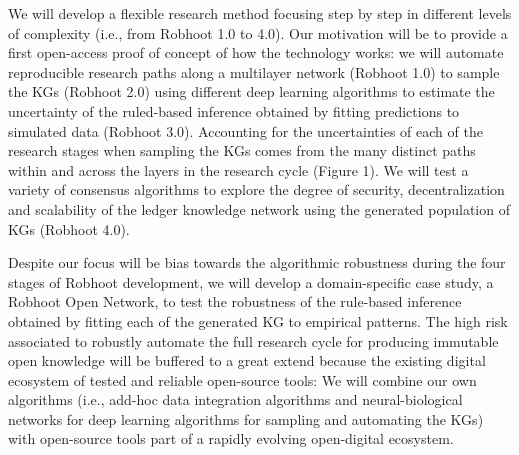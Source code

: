 \documentclass[10pt, a4paper, twocolumn]{article} %
\begin{document}
We will develop a flexible research method focusing step by step in
different levels of complexity (i.e., from Robhoot 1.0 to 4.0). Our
motivation will be to provide a first open-access proof of concept of
how the technology works: we will automate reproducible research paths
along a multilayer network (Robhoot 1.0) to sample the KGs (Robhoot
2.0) using different deep learning algorithms to estimate the
uncertainty of the ruled-based inference obtained by fitting
predictions to simulated data (Robhoot 3.0). Accounting for the
uncertainties of each of the research stages when sampling the KGs
comes from the many distinct paths within and across the layers in the
research cycle (Figure 1). We will test a variety of consensus
algorithms to explore the degree of security, decentralization and
scalability of the ledger knowledge network using the generated
population of KGs (Robhoot 4.0).

Despite our focus will be bias towards the algorithmic robustness
during the four stages of Robhoot development, we will develop a
domain-specific case study, a Robhoot Open Network, to test the
robustness of the rule-based inference obtained by fitting each of the
generated KG to empirical patterns. The high risk associated to
robustly automate the full research cycle for producing immutable open
knowledge will be buffered to a great extend because the existing
digital ecosystem of tested and reliable open-source tools: We will
combine our own algorithms (i.e., add-hoc data integration algorithms
and neural-biological networks for deep learning algorithms for
sampling and automating the KGs) with open-source tools part of a
rapidly evolving open-digital ecosystem.



\newpage

%


\end{document}
